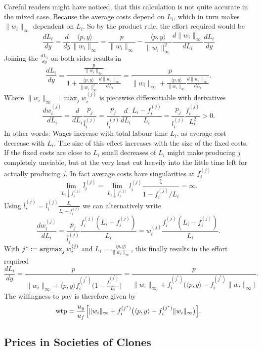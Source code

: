 Careful readers might have noticed, that
this calculation is not quite accurate in the mixed case. Because the average costs
depend on \(L_i\), which in turn makes \(\|w_i\|_\infty\) dependent on \(L_i\).
So by the product rule, the effort required would be
\[
		\frac{dL_i}{dy}
		= \frac{d}{dy} \frac{\langle p, y\rangle}{\|w_i\|_\infty}
		= \frac{p}{\|w_i\|_\infty}
		- \frac{\langle p, y\rangle}{\|w_i\|_\infty^2}
		\frac{d\|w_i\|_\infty}{dL_i}\frac{dL_i}{dy}
\]
Joining the \(\frac{dL_i}{dy}\) on both sides results in
\[
	\frac{dL_i}{dy}
	= \frac{\frac{p}{\|w_i\|_\infty}}{
		1 + \frac{\langle p, y\rangle}{\|w_i\|_\infty^2}
		\frac{d\|w_i\|_\infty}{dL_i}
	}
	= \frac{p}{
		\|w_i\|_\infty + \frac{\langle p, y\rangle}{\|w_i\|_\infty}
		\frac{d\|w_i\|_\infty}{dL_i}
	}.
\]
Where \(\|w_i\|_\infty=\max_{j} w_i^{(j)}\) is piecewise differentiable with derivatives
\[
	\frac{dw_i^{(j)}}{dL_i}
	= \frac{d}{dL_i} \frac{p_j}{\bar{l}_i^{(j)}}
	= \frac{p_j}{l_i^{(j)}} \frac{d}{dL_i} \frac{L_i-f_i^{(j)}}{L_i}
	= \frac{p_j}{l_i^{(j)}} \frac{f_i^{(j)}}{L_i^2} > 0.
\]
In other words: Wages increase with total labour time \(L_i\), as
average cost decrease with \(L_i\). The size of this effect increases with the
size of the fixed costs. If the fixed costs are close to \(L_i\) small decreases
of \(L_i\) might make producing \(j\) completely unviable, but at the very least
cut heavily into the little time left for actually producing \(j\). In fact
average costs have singularities at \(f_i^{(j)}\)
\[
	\lim_{L_i\downarrow f_i^{(j)}} \bar{l}_i^{(j)}
	= \lim_{L_i\downarrow f_i^{(j)}}l_i^{(j)}\frac{1}{1-f_i^{(j)}/L_i}
	= \infty.
\]
Using \(\bar{l}_i^{(j)}=l_i^{(j)}\frac{L_i}{L_i-f_i^{(j)}}\) we can alternatively
write
\[
	\frac{dw_i^{(j)}}{dL_i}
	= \frac{p_j}{\bar{l}_i^{(j)}} \frac{f_i^{(j)}(L_i-f_i^{(j)})}{L_i}
	= w_i^{(j)} \frac{f_i^{(j)}(L_i-f_i^{(j)})}{L_i}.
\]
With \(j^* := \operatorname*{argmax}_{j} w_i^{(j)}\) and \(L_i = \frac{\langle p,
y\rangle}{\|w_i\|_\infty}\), this finally results in the effort required
\[
	\frac{dL_i}{dy}
	= \frac{p}{
		\|w_i\|_\infty + \langle p, y\rangle f_i^{(j^*)}
		\bigl(1-\frac{f_i^{(j^*)}}{L_i}\bigr)
	}
	= \frac{p}{
		\|w_i\|_\infty + f_i^{(j^*)}
		\bigl(\langle p, y\rangle-f_i^{(j^*)}\|w_i\|_\infty\bigr)
	}.
\]
The willingness to pay is therefore given by
\[
	\text{wtp} = \frac{u_y}{u_f}\Bigl[
		\|w_i\|_\infty + f_i^{(j^*)}
		\bigl(\langle p, y\rangle-f_i^{(j^*)}\|w_i\|_\infty\bigr)
	\Bigr].
\]

\subsection{Prices in Societies of Clones}

\begin{example*}

\end{example*}